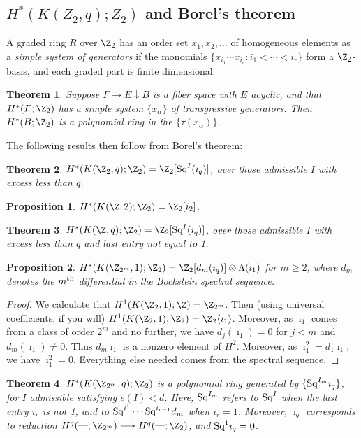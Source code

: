 \documentclass[11pt]{article}
\newcommand{\Squ}{\textup{Sq}}
\newcommand{\DASH}{\textup{---}}
\theoremstyle{plain}
\newtheorem*{thm*}{Theorem}
\newtheorem*{prop*}{Proposition}
\theoremstyle{definition}
\renewcommand{\to}{\longrightarrow}
\begin{document}
\subsection{\texorpdfstring{$H^*(K(Z_2,q);Z_2)$}{H*(K(Z/2,q);Z/2)} and Borel's theorem}
A graded ring $R$ over $\Z_2$ has an order set $x_1,x_2,\ldots$ of homogeneous elements as a \emph{simple system of generators} if the monomials $\{x_{i_1}\cdots x_{i_r}:i_1<\cdots<i_r\}$ form a $\Z_2$-basis, and each graded part is finite dimensional.
\begin{thm*}
Suppose $F\rightarrow E\downarrow B$ is a fiber space with $E$ acyclic, and that $H^*(F;\Z_2)$ has a simple system $\{x_\alpha\}$ of transgressive generators. Then $H^*(B;\Z_2)$ is a polynomial ring in the $\{\tau(x_\alpha)\}$.
\end{thm*}
The following results then follow from Borel's theorem:
\begin{thm*}
$H^*(K(\Z_2,q);\Z_2)=\Z_2[\Squ^I(\imath_q)]$, over those admissible $I$ with excess less than $q$.
\end{thm*}
\begin{prop*}
$H^*(K(\Z,2);\Z_2)=\Z_2[i_2]$.
\end{prop*}
\begin{thm*}$H^*(K(\Z,q);\Z_2)=\Z_2[\Squ^I(\imath_q)]$, over those admissible $I$ with excess less than $q$ and last entry not equal to 1.
\end{thm*}
\begin{prop*}$H^*(K(\Z_{2^m},1);\Z_2)=\Z_2[d_m(\imath_q)]\otimes \Lambda(\imath_1)$ for $m\geq2$, where $d_m$ denotes the $m^\textup{th}$ differential in the Bockstein spectral sequence.
\end{prop*}
\begin{proof}
We calculate that $H^1(K(\Z_2,1);\Z)=\Z_{2^m}$. Then (using universal coefficients, if you will) $H^1(K(\Z_2,1);\Z_2)=\Z_{2}\langle\imath_1\rangle$. Moreover, as $\imath_1$ comes from a class of order $2^m$ and no further, we have $d_j(\imath_1)=0$ for $j<m$ and $d_m(\imath_1)\neq0$. Thus $d_m\imath_1$ is a nonzero element of $H^2$. Moreover, as $\imath_1^2=d_1\imath_1$, we have $\imath_1^2=0$. Everything else needed comes from the spectral sequence.
\end{proof}
\begin{thm*}
$H^*(K(\Z_{2^m},q);\Z_2)$ is a polynomial ring generated by
$\{\Squ^{I_m}\imath_q\}$, for $I$ admissible satisfying $e(I)<d$. Here,
$\Squ^{I_m}$ refers to $\Squ^I$ when the last entry $i_r$ is not 1, and to
$\Squ^{i^1}\cdots \Squ^{i_{r-1}}d_m$ when $i_r=1$. Moreover, $\imath_q$ corresponds
to reduction $H^q(\DASH;\Z_{2^m})\to H^q(\DASH;\Z_{2})$, and $\Squ^1\imath_q=0$.
\end{thm*}
\end{document}
